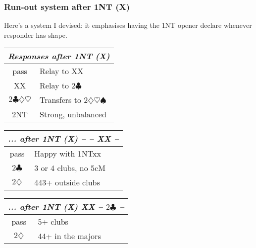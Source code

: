 \documentclass[a4paper, twoside, 11pt]{article}
\begin{document}
\begin{multicols}{3}

\subsubsection*{Run-out system after \textnormal{1NT} (X)}
Here's a system I devised: it emphasises having the \textnormal{1NT} opener declare whenever responder has shape.

\begin{center}
\begin{tabular}{ |c|l| }
 \hline
 \multicolumn{2}{|c|}{\textit{Responses after \textnormal{1NT} (X)}} \\
 \hline
 pass & Relay to XX \\
 XX & Relay to $2\clubsuit$ \\
 $2\clubsuit\diamondsuit\heartsuit$ & Transfers to $2\diamondsuit\heartsuit\spadesuit$ \\
 \textnormal{2NT} & Strong, unbalanced\\
 \hline
\end{tabular}
\end{center}



\begin{center}
\begin{tabular}{ |c|l| }
 \hline
 \multicolumn{2}{|c|}{\textit{... after \textnormal{1NT} (X) -- -- XX --}} \\
 \hline
 pass & Happy with \textnormal{1NT}xx \\
 $2\clubsuit$ & 3 or 4 clubs, no 5cM \\
 $2\diamondsuit$ & 443+ outside clubs \\
 \hline
\end{tabular}
\end{center}

\begin{center}
\begin{tabular}{ |c|l| }
 \hline
 \multicolumn{2}{|c|}{\textit{... after \textnormal{1NT} (X) XX -- $2\clubsuit$ --}} \\
 \hline
 pass & 5+ clubs \\
 $2\diamondsuit$ & 44+ in the majors \\


\end{tabular}
\end{center}
\end{multicols}
\end{document}
